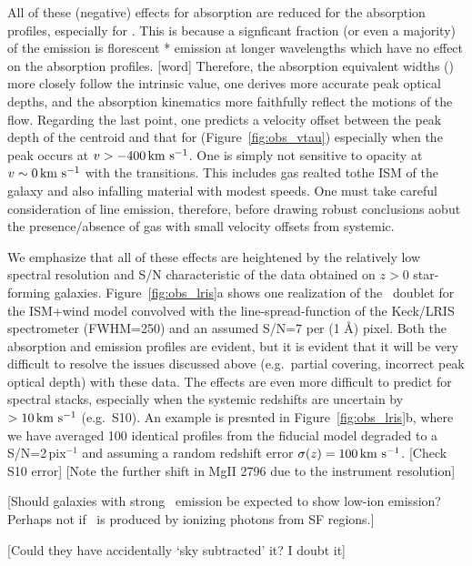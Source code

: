 \documentclass[12pt,preprint]{aastex}
\begin{document}
All of these (negative) effects for  absorption are reduced
for the  absorption profiles, especially for \feiia.  This
is because a signficant fraction (or even a majority) of the
 emission is florescent * emission at longer
wavelengths which have no effect on the absorption profiles. [word]
Therefore, the  absorption equivalent widths (\ewabs) more
closely follow the intrinsic value, one derives more accurate peak
optical depths, and the absorption kinematics more faithfully reflect
the motions of the flow.  Regarding the last point, one 
predicts a velocity offset between the peak depth of the 
centroid and that for  (Figure~\ref{fig:obs_vtau})
especially when the peak occurs at $v > -400 \, {\rm km~s^{-1}}$.  One is simply
not sensitive to opacity at $v \sim 0 \, {\rm km~s^{-1}}$ with the 
transitions.  This includes gas realted tothe ISM of the galaxy and
also infalling material with modest speeds.  One must take careful
consideration of line emission, therefore,  before drawing robust
conclusions aobut the presence/absence of gas with small velocity
offsets from systemic.

We emphasize that all of these effects are heightened by the
relatively low spectral resolution and S/N characteristic of the data
obtained on $z>0$ star-forming galaxies.  Figure~\ref{fig:obs_lris}a
shows one realization of the \mgiid\ doublet for the ISM+wind model
convolved with the line-spread-function of the Keck/LRIS spectrometer
(FWHM=250\kms) and an assumed S/N=7 per (1 \AA) pixel.  Both the absorption
and emission profiles are evident, but it is evident that it will be
very difficult to resolve the issues discussed above (e.g.\ partial
covering, incorrect peak optical depth) with these data.  The effects
are even more difficult to predict for spectral stacks, especially
when the systemic redshifts are uncertain by $> 10 \, {\rm km~s^{-1}}$ (e.g.\ S10).
An example is presnted in Figure~\ref{fig:obs_lris}b, where we have
averaged 100 identical  profiles from the fiducial model
degraded to a S/N=2\,pix$^{-1}$ and assuming a random redshift error
$\sigma(z) = 100\, {\rm km~s^{-1}}$.  [Check S10 error] [Note the further shift in
MgII 2796 due to the instrument resolution]

[Should galaxies with strong \lya\ emission be expected to show
low-ion emission? Perhaps not if \lya\ is produced by ionizing photons
from SF regions.]

[Could they have accidentally `sky subtracted' it?  I doubt it]
\end{document}
